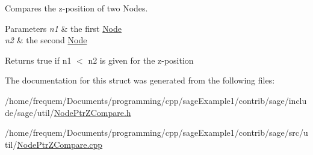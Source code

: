 Compares the z-\/position of two Nodes. 


\begin{DoxyParams}{Parameters}
{\em n1} & the first \mbox{\hyperlink{classsage_1_1Node}{Node}} \\
\hline
{\em n2} & the second \mbox{\hyperlink{classsage_1_1Node}{Node}} \\
\hline
\end{DoxyParams}
\begin{DoxyReturn}{Returns}
true if n1 $<$ n2 is given for the z-\/position 
\end{DoxyReturn}


The documentation for this struct was generated from the following files\+:\begin{DoxyCompactItemize}
\item 
/home/frequem/\+Documents/programming/cpp/sage\+Example1/contrib/sage/include/sage/util/\mbox{\hyperlink{NodePtrZCompare_8h}{Node\+Ptr\+Z\+Compare.\+h}}\item 
/home/frequem/\+Documents/programming/cpp/sage\+Example1/contrib/sage/src/util/\mbox{\hyperlink{NodePtrZCompare_8cpp}{Node\+Ptr\+Z\+Compare.\+cpp}}\end{DoxyCompactItemize}
